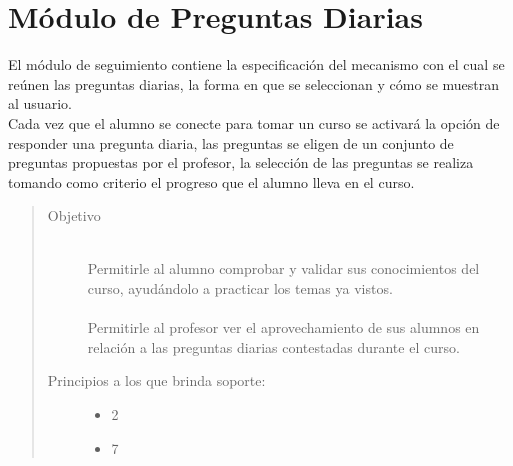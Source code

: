 \chapter{Módulo de Preguntas Diarias}
\label{mod:seguimiento}

    El módulo de seguimiento contiene la especificación del mecanismo con el cual se reúnen las preguntas diarias, la forma en que se seleccionan y cómo se muestran al usuario.\\


    \noindent Cada vez que el alumno se conecte para tomar un curso se activará la opción de responder una pregunta diaria, las preguntas se eligen de un conjunto de preguntas propuestas por el profesor, la selección de las preguntas se realiza tomando como criterio el progreso que el alumno lleva en el curso.

    \begin{quote}
    \begin{description}
        \item[Objetivo] \hfill\\
            Permitirle al alumno comprobar y validar sus conocimientos del curso, ayudándolo a practicar los temas ya vistos.\\\\
            Permitirle al profesor ver el aprovechamiento de sus alumnos en relación a las preguntas diarias contestadas durante el curso.
        \item[Principios a los que brinda soporte:] \hfill
            \begin{itemize}
                \item 2 \principioII
                \item 7 \principioVII
            \end{itemize}
    \end{description}
    \end{quote}
